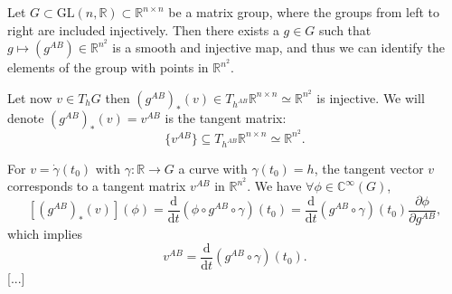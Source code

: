 \begin{definition}
    Let \(G \subset \mathrm{GL}(n, \mathbb{R}) \subset \mathbb{R}^{n\times n}\) be a matrix group, where the groups from left to right are included injectively. Then there exists a \(g \in G\) such that \(g \mapsto (g^{AB})\in \mathbb{R}^{n^2}\) is a smooth and injective map, and thus we can identify the elements of the group with points in \(\mathbb{R}^{n^2}\).

    Let now \(v \in T_h G\) then \((g^{AB})_*(v) \in T_{h^{AB}}\mathbb{R}^{n \times n} \simeq \mathbb{R}^{n^2}\) is injective. We will denote \((g^{AB})_*(v) = v^{AB}\) is the tangent matrix:
    \[
        \{v^{AB}\} \subseteq T_{h^{AB}} \mathbb{R}^{n \times n} \simeq \mathbb{R}^{n^2}.
    \]
\end{definition}

For \(v = \dot{\gamma}(t_0)\) with \(\gamma : \mathbb{R} \to G\) a curve with \(\gamma(t_0) = h\), the tangent vector \(v\) corresponds to a tangent matrix \(v^{AB}\) in \(\mathbb{R}^{n^2}\). We have \(\forall \phi \in \mathbb{C}^{\infty}(G)\),
\[
    [(g^{AB})_*(v)](\phi) = \frac{\mathrm{d}}{\mathrm{d} t} (\phi \circ g^{AB} \circ \gamma) (t_0) = \frac{\mathrm{d}}{\mathrm{d} t} (g^{AB} \circ \gamma) (t_0) \frac{\partial \phi}{\partial g^{AB}},
\]
which implies
\[
    v^{AB} = \frac{\mathrm{d}}{\mathrm{d} t} (g^{AB} \circ \gamma) (t_0).
\]
[...]